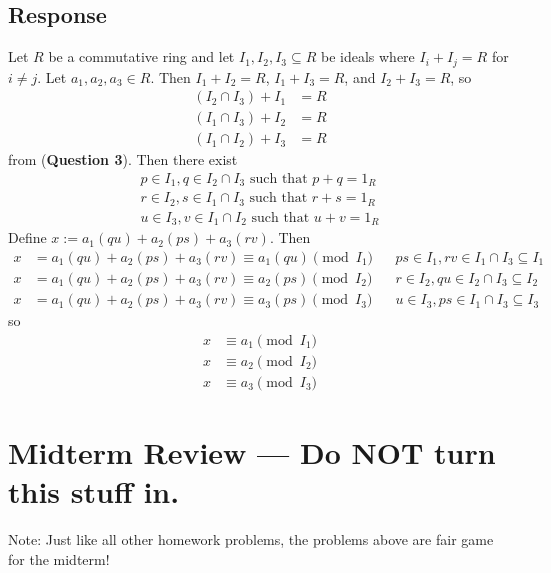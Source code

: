 \documentclass [12pt] {article}
\renewcommand{\bf}[1]{\textbf{{#1}}}
\begin{document}
\subsection*{Response}
Let $R$ be a commutative ring and let $I_1, I_2, I_3 \subseteq R$ be ideals where 
$I_i + I_j = R$ for $i \neq j$. Let $a_1, a_2, a_3 \in R$.
Then $I_1 + I_2 = R$, $I_1 + I_3 = R$, and $I_2 + I_3 = R$, so 
\begin{align*}
    (I_2 \cap I_3) + I_1 &= R \\
    (I_1 \cap I_3) + I_2 &= R \\
    (I_1 \cap I_2) + I_3 &= R
\end{align*}
from (\bf{Question 3}).
Then there exist 
\begin{align*}
    p \in I_1, q \in I_2 \cap I_3 \text{ such that } p + q = 1_R \\
    r \in I_2, s \in I_1 \cap I_3 \text{ such that } r + s = 1_R \\
    u \in I_3, v \in I_1 \cap I_2 \text{ such that } u + v = 1_R
\end{align*}
Define
$x := a_1(qu) + a_2(ps) + a_3(rv)$. Then
\begin{align*}
    x &= a_1(qu) + a_2(ps) + a_3(rv) 
    \equiv a_1(qu) \pmod{I_1} && ps \in I_1, rv \in I_1 \cap I_3 \subseteq I_1 \\
    x &= a_1(qu) + a_2(ps) + a_3(rv) 
    \equiv a_2(ps) \pmod{I_2} && r \in I_2, qu \in I_2 \cap I_3 \subseteq I_2 \\
    x &= a_1(qu) + a_2(ps) + a_3(rv) 
    \equiv a_3(ps) \pmod{I_3} && u \in I_3, ps \in I_1 \cap I_3 \subseteq I_3
\end{align*}
so
\begin{align*}
      x &\equiv a_1 \pmod{I_1} \\
      x &\equiv a_2 \pmod{I_2} \\
      x &\equiv a_3 \pmod{I_3}
\end{align*}

\newpage
\section{Midterm Review --- Do NOT turn this stuff in.}

Note: Just like all other homework problems, the problems above are fair game for the midterm! 
\end{document}
